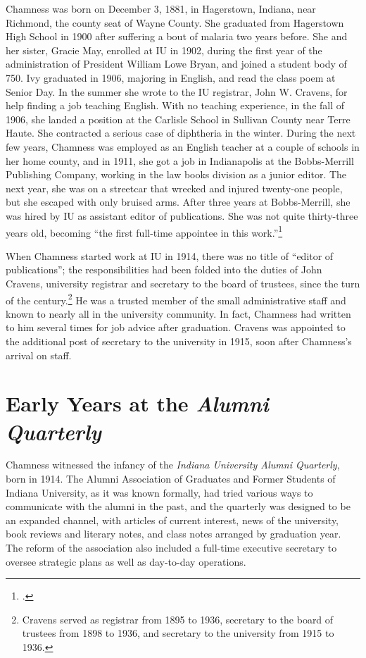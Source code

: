\documentclass[
  american,
  letterpaper,
]{scrreprt}
\begin{document}
Chamness was born on December 3, 1881, in Hagerstown, Indiana, near
Richmond, the county seat of Wayne County. She graduated from Hagerstown
High School in 1900 after suffering a bout of malaria two years before.
She and her sister, Gracie May, enrolled at IU in 1902, during the first
year of the administration of President William Lowe Bryan, and joined a
student body of 750. Ivy graduated in 1906, majoring in English, and
read the class poem at Senior Day. In the summer she wrote to the IU
registrar, John W. Cravens, for help finding a job teaching English.
With no teaching experience, in the fall of 1906, she landed a position
at the Carlisle School in Sullivan County near Terre Haute. She
contracted a serious case of diphtheria in the winter. During the next
few years, Chamness was employed as an English teacher at a couple of
schools in her home county, and in 1911, she got a job in Indianapolis
at the Bobbs-Merrill Publishing Company, working in the law books
division as a junior editor. The next year, she was on a streetcar that
wrecked and injured twenty-one people, but she escaped with only bruised
arms. After three years at Bobbs-Merrill, she was hired by IU as
assistant editor of publications. She was not quite thirty-three years
old, becoming ``the first full-time appointee in this work.''\footnote{.}

When Chamness started work at IU in 1914, there was no title of ``editor
of publications''; the responsibilities had been folded into the duties
of John Cravens, university registrar and secretary to the board of
trustees, since the turn of the century.\footnote{Cravens served as
  registrar from 1895 to 1936, secretary to the board of trustees from
  1898 to 1936, and secretary to the university from 1915 to 1936.} He
was a trusted member of the small administrative staff and known to
nearly all in the university community. In fact, Chamness had written to
him several times for job advice after graduation. Cravens was appointed
to the additional post of secretary to the university in 1915, soon
after Chamness's arrival on staff.

\section{\texorpdfstring{Early Years at the \emph{Alumni
Quarterly}}{Early Years at the Alumni Quarterly}}\label{early-years-at-the-alumni-quarterly}

Chamness witnessed the infancy of the \emph{Indiana University Alumni
Quarterly}, born in 1914. The Alumni Association of Graduates and Former
Students of Indiana University, as it was known formally, had tried
various ways to communicate with the alumni in the past, and the
quarterly was designed to be an expanded channel, with articles of
current interest, news of the university, book reviews and literary
notes, and class notes arranged by graduation year. The reform of the
association also included a full-time executive secretary to oversee
strategic plans as well as day-to-day operations.
\end{document}
